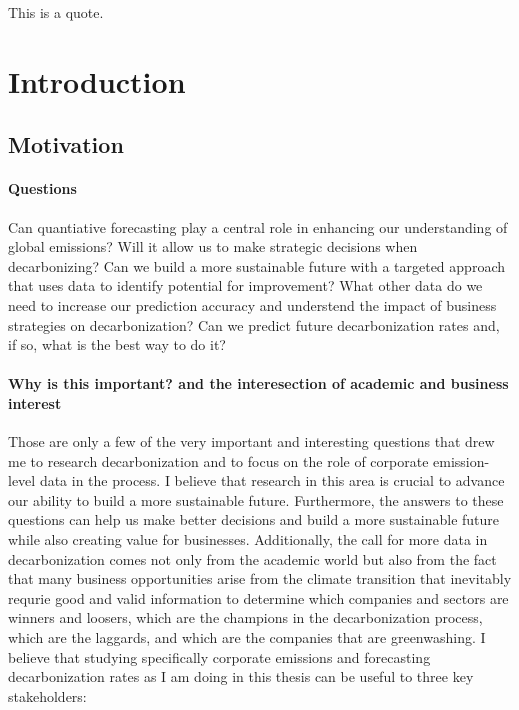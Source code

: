 \begin{savequote}[75mm]
This is a quote.
\end{savequote}

\chapter{Introduction}
\section{Motivation}
\subsubsection{Questions}
 Can quantiative forecasting play a central role in enhancing our understanding of global emissions? Will it allow us to make strategic decisions when decarbonizing? Can we build a more sustainable future with a targeted approach that uses data to identify potential for improvement? What other data do we need to increase our prediction accuracy and understend the impact of business strategies on decarbonization? Can we predict future decarbonization rates and, if so, what is the best way to do it? \\ 
 \subsubsection{Why is this important? and the interesection of academic and business interest}
 \noindent Those are only a few of the very important and interesting questions that drew me to research decarbonization and to focus on the role of corporate emission-level data in the process. I believe that research in this area is crucial to advance our ability to build a more sustainable future. Furthermore, the answers to these questions can help us make better decisions and build a more sustainable future while also creating value for businesses. Additionally, the call for more data in decarbonization comes not only from the academic world but also from the fact that many business opportunities arise from the climate transition that inevitably requrie good and valid information to determine which companies and sectors are winners and loosers, which are the champions in the decarbonization process, which are the laggards, and which are the companies that are greenwashing. I believe that studying specifically corporate emissions and forecasting decarbonization rates as I am doing in this thesis can be useful to three key stakeholders: 
